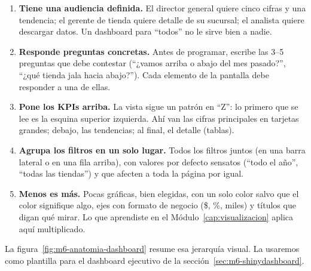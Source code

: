 \begin{enumerate}
  \item \textbf{Tiene una audiencia definida.} El director general quiere
        cinco cifras y una tendencia; el gerente de tienda quiere detalle de
        su sucursal; el analista quiere descargar datos. Un dashboard para
        ``todos'' no le sirve bien a nadie.
  \item \textbf{Responde preguntas concretas.} Antes de programar, escribe
        las 3--5 preguntas que debe contestar (``¿vamos arriba o abajo del
        mes pasado?'', ``¿qué tienda jala hacia abajo?''). Cada elemento de
        la pantalla debe responder a una de ellas.
  \item \textbf{Pone los KPIs arriba.} La vista sigue un patrón en ``Z'': lo
        primero que se lee es la esquina superior izquierda. Ahí van las
        cifras principales en tarjetas grandes; debajo, las tendencias; al
        final, el detalle (tablas).
  \item \textbf{Agrupa los filtros en un solo lugar.} Todos los filtros
        juntos (en una barra lateral o en una fila arriba), con valores por
        defecto sensatos (``todo el año'', ``todas las tiendas'') y que
        afecten a toda la página por igual.
  \item \textbf{Menos es más.} Pocas gráficas, bien elegidas, con un solo
        color salvo que el color signifique algo, ejes con formato de negocio
        (\$, \%, miles) y títulos que digan qué mirar. Lo que aprendiste en el
        Módulo~\ref{cap:visualizacion} aplica aquí multiplicado.
\end{enumerate}

La figura~\ref{fig:m6-anatomia-dashboard} resume esa jerarquía visual. La
usaremos como plantilla para el dashboard ejecutivo de la
sección~\ref{sec:m6-shinydashboard}.

